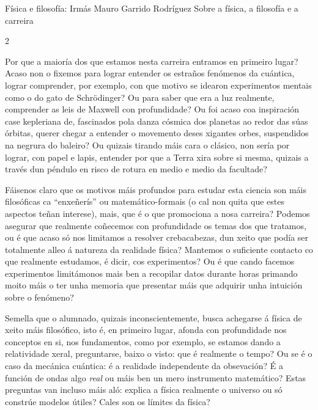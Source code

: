 \Titular*%
{filosofia}
{Física e filosofía: Irmás}
{Mauro Garrido Rodríguez}
{Sobre a física, a filosofía e a carreira}

\begin{multicols}{2}

Por que a maioría dos que estamos nesta carreira entramos en primeiro lugar?
Acaso non o fixemos para lograr entender os estraños fenómenos da cuántica,
lograr comprender, por exemplo, con que motivo se idearon experimentos mentais
como o do gato de Schrödinger? Ou para saber que era a luz realmente,
comprender as leis de Maxwell con profundidade? Ou foi acaso coa inspiración
case kepleriana de, fascinados pola danza cósmica dos planetas ao redor das
súas órbitas, querer chegar a entender o movemento deses xigantes orbes,
suspendidos na negrura do baleiro? Ou quizais tirando máis cara o clásico, non
sería por lograr, con papel e lapis, entender por que a Terra xira sobre si
mesma, quizais a través dun péndulo en risco de rotura en medio e medio da
facultade?

Fáisenos claro que os motivos máis profundos para estudar esta
ciencia son máis filosóficas ca ``enxeñerís'' ou matemático-formais (o cal non
quita que estes aspectos teñan interese), mais, que é o que promociona a nosa
carreira? Podemos asegurar que realmente coñecemos con profundidade os temas
dos que tratamos, ou é que acaso só nos limitamos a resolver crebacabezas, dun
xeito que podía ser totalmente alleo á natureza da realidade física? Mantemos o
suficiente contacto co que realmente estudamos, é dicir, cos experimentos? Ou é
que cando facemos experimentos limitámonos mais ben a recopilar datos durante
horas primando moito máis o ter unha memoria que presentar máis que adquirir
unha intuición sobre o fenómeno?

Semella que o alumnado, quizais
inconscientemente, busca achegarse á física de xeito máis filosófico, isto é,
en primeiro lugar, afonda con profundidade nos conceptos en si, nos
fundamentos, como por exemplo, se estamos dando a relatividade xeral,
preguntarse, baixo o visto: que é realmente o tempo? Ou se é o caso da mecánica
cuántica: é a realidade independente da obsevación? É a función de ondas algo
\textit{real} ou máis ben un mero instrumento matemático? Estas preguntas van
incluso máis aló: explica a física realmente o universo ou só constrúe modelos
útiles? Cales son os límites da física?


\end{multicols}
